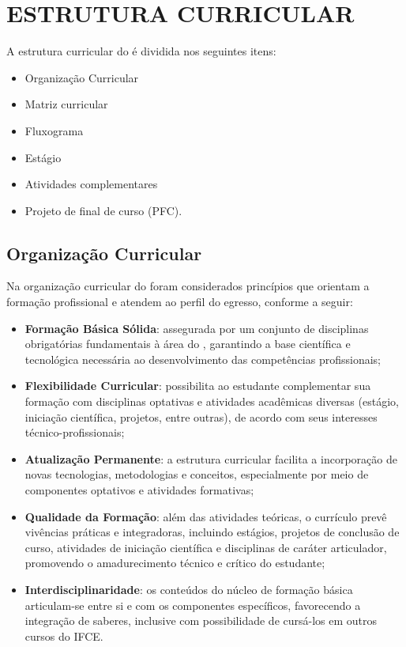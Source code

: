 

\section{ESTRUTURA CURRICULAR}
A estrutura curricular do \NOMECURSO é dividida nos seguintes itens: 

\begin{itemize}
	\item Organização Curricular 
	\item Matriz curricular 
	\item Fluxograma
	\item Estágio
	\item Atividades complementares 
	\item Projeto de final de curso (PFC). 
\end{itemize}

\subsection{Organização Curricular}
Na organização curricular do \NOMECURSO foram considerados princípios que orientam a formação profissional e atendem ao perfil do egresso, conforme a seguir:

\begin{itemize}
	\item \textbf{Formação Básica Sólida}: assegurada por um conjunto de disciplinas obrigatórias fundamentais à área do \NOMECURSO, garantindo a base científica e tecnológica necessária ao desenvolvimento das competências profissionais;
	\item \textbf{Flexibilidade Curricular}: possibilita ao estudante complementar sua formação com disciplinas optativas e atividades acadêmicas diversas (estágio, iniciação científica, projetos, entre outras), de acordo com seus interesses técnico-profissionais;
	\item \textbf{Atualização Permanente}: a estrutura curricular facilita a incorporação de novas tecnologias, metodologias e conceitos, especialmente por meio de componentes optativos e atividades formativas;
	\item \textbf{Qualidade da Formação}: além das atividades teóricas, o currículo prevê vivências práticas e integradoras, incluindo estágios, projetos de conclusão de curso, atividades de iniciação científica e disciplinas de caráter articulador, promovendo o amadurecimento técnico e crítico do estudante;
	\item \textbf{Interdisciplinaridade}: os conteúdos do núcleo de formação básica articulam-se entre si e com os componentes específicos, favorecendo a integração de saberes, inclusive com possibilidade de cursá-los em outros cursos do IFCE.
\end{itemize}

